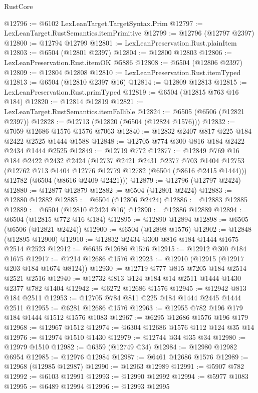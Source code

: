 \begin{lexlean}{RustCore}
\begin{coremodule}
@12796 := @6102 LexLeanTarget.TargetSyntax.Prim
@12797 := LexLeanTarget.RustSemantics.itemPrimitive
@12799 := @12796 (@12797 @2397)
@12800 := @12794 @12799
@12801 := LexLeanPreservation.Rust.plainItem
@12803 := @6504 (@12801 @2397)
@12804 := @12800 @12803
@12806 := LexLeanPreservation.Rust.itemOK @5886
@12808 := @6504 (@12806 @2397)
@12809 := @12804 @12808
@12810 := LexLeanPreservation.Rust.itemTyped
@12813 := @6504 (@12810 @2397 @16)
@12814 := @12809 @12813
@12815 := LexLeanPreservation.Rust.primTyped
@12819 := @6504 (@12815 @763 @16 @184)
@12820 := @12814 @12819
@12821 := LexLeanTarget.RustSemantics.itemFallible
@12824 := @6505 (@6506 (@12821 @2397))
@12828 := @12713 (@12820 (@6504 (@12824 @1576)))
@12832 := @7059 @12686 @1576 @1576 @7063
@12840 := @12832 @2407 @817 @225 @184 @2422 @2525 @1444 @1588
@12848 := @12705 @774 @300 @816 @184 @2422 @2434 @1444 @2525
@12849 := @12719 @772
@12877 := @12849
    @769
    @16
    @184
    @2422
    @2432
    @2424
    (@12737
      @2421
      @2431
      @2377
      @703
      @1404
      @12753
      (@12762 @713 @1404 @12776 @12779 @12782 (@6504 (@8616 @2415 @1444)))
      @12782
      (@6504 (@8616 @2409 @2421)))
@12879 := @12796 (@12797 @2424)
@12880 := @12877 @12879
@12882 := @6504 (@12801 @2424)
@12883 := @12880 @12882
@12885 := @6504 (@12806 @2424)
@12886 := @12883 @12885
@12889 := @6504 (@12810 @2424 @16)
@12890 := @12886 @12889
@12894 := @6504 (@12815 @772 @16 @184)
@12895 := @12890 @12894
@12898 := @6505 (@6506 (@12821 @2424))
@12900 := @6504 (@12898 @1576)
@12902 := @12848 (@12895 @12900)
@12910 := @12832 @2434 @300 @816 @184 @1444 @1675 @2514 @2523
@12912 := @6635 @12686 @1576
@12915 := @12912 @300 @184 @1675
@12917 := @7214 @12686 @1576
@12923 := @12910 (@12915 (@12917 @203 @184 @1674 @8124))
@12930 := @12719 @777 @815 @7205 @184 @2514 @2521 @2516
@12940 := @12732 @813 @124 @184 @14 @2511 @1444 @1430 @2377 @782 @1404
@12942 := @6272 @12686 @1576
@12945 := @12942 @813 @184 @2511
@12953 := @12705 @784 @811 @225 @184 @1444 @2445 @1444 @2511
@12955 := @6281 @12686 @1576
@12963 := @12955 @782 @196 @179 @184 @1444 @1512 @1576 @1083
@12967 := @6295 @12686 @1576 @196 @179
@12968 := @12967 @1512
@12974 := @6304 @12686 @1576 @112 @124 @35 @14
@12976 := @12974 @1510 @1430
@12979 := @12744 @34 @35 @34
@12980 := @12979 @1510
@12982 := @6359 (@12749 @34)
@12984 := @12980 @12982 @6954
@12985 := @12976 @12984
@12987 := @6461 @12686 @1576
@12989 := @12968 (@12985 @12987)
@12990 := @12963 @12989
@12991 := @5907 @782
@12992 := @6103 @12991
@12993 := @12990 @12992
@12994 := @5977 @1083
@12995 := @6489 @12994
@12996 := @12993 @12995

\end{coremodule}
\end{lexlean}
